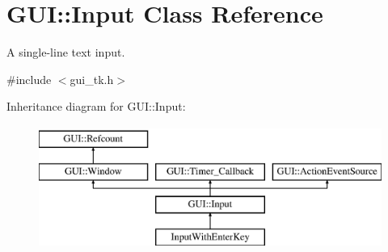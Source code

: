 \hypertarget{classGUI_1_1Input}{\section{G\-U\-I\-:\-:Input Class Reference}
\label{classGUI_1_1Input}
}


A single-\/line text input.  




{\ttfamily \#include $<$gui\-\_\-tk.\-h$>$}

Inheritance diagram for G\-U\-I\-:\-:Input\-:\begin{figure}[H]
\begin{center}
\leavevmode
\includegraphics[height=4.000000cm]{classGUI_1_1Input}
\end{center}
\end{figure}
